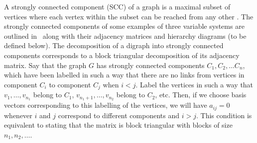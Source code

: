 
A strongly connected component (SCC) of a graph is a maximal subset of vertices where each vertex within the subset can be reached from any other \cite{Cormen2009}. The strongly connected components of some examples of three variable systems are outlined in $\,$ along with their adjacency matrices and hierarchy diagrams (to be defined below).
The decomposition of a digraph into strongly connected components corresponds to a block triangular decomposition of its adjacency matrix.  Say that the graph $G$ has strongly connected components $C_1, C_2, \ldots C_n$, which have been labelled in such a way that there are no links from vertices in component $C_i$ to component $C_j$ when $i < j$.  Label the vertices in such a way that $v_1, \ldots, v_{n_1}$ belong to $C_1$, $v_{n_1 + 1}, \ldots, v_{n_2}$ belong to $C_2$, etc.  Then, if we choose basis vectors corresponding to this labelling of the vertices, we will have $a_{ij} = 0$ whenever $i$ and $j$ correspond to different components and $i > j$.  This condition is equivalent to stating that the matrix is block triangular with blocks of size $n_1, n_2, \ldots$.

